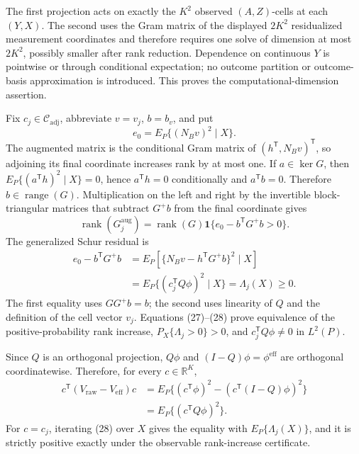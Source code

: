 The first projection acts on exactly the \(K^2\) observed \((A,Z)\)-cells at each \((Y,X)\).  The second uses the Gram matrix of the displayed \(2K^2\) residualized measurement coordinates and therefore requires one solve of dimension at most \(2K^2\), possibly smaller after rank reduction.  Dependence on continuous \(Y\) is pointwise or through conditional expectation; no outcome partition or outcome-basis approximation is introduced.  This proves the computational-dimension assertion.

Fix \(c_j\in\mathcal C_{\mathrm{adj}}\), abbreviate \(v=v_j\), \(b=b_v\), and put
\[
 e_0=E_P\{(N_Bv)^2\mid X\}. \tag{26}
\]
The augmented matrix is the conditional Gram matrix of \((h^{\mathsf T},N_Bv)^{\mathsf T}\), so adjoining its final coordinate increases rank by at most one.  If \(a\in\ker G\), then
\(E_P\{(a^{\mathsf T}h)^2\mid X\}=0\), hence \(a^{\mathsf T}h=0\) conditionally and \(a^{\mathsf T}b=0\).  Therefore \(b\in\operatorname{range}(G)\).  Multiplication on the left and right by the invertible block-triangular matrices that subtract \(G^+b\) from the final coordinate gives
\[
 \operatorname{rank}(G_j^{\mathrm{aug}})
 =\operatorname{rank}(G)
 \mathbf 1\{e_0-b^{\mathsf T}G^+b>0\}. \tag{27}
\]
The generalized Schur residual is
\[
\begin{aligned}
 e_0-b^{\mathsf T}G^+b
 &=E_P\!\left[\{N_Bv-h^{\mathsf T}G^+b\}^2\mid X\right]\\
 &=E_P\{(c_j^{\mathsf T}Q\phi)^2\mid X\}
 =\Lambda_j(X)\geq0. \tag{28}
\end{aligned}
\]
The first equality uses \(GG^+b=b\); the second uses linearity of \(Q\) and the definition of the cell vector \(v_j\).  Equations (27)--(28) prove equivalence of the positive-probability rank increase, \(P_X\{\Lambda_j>0\}>0\), and \(c_j^{\mathsf T}Q\phi\ne0\) in \(L^2(P)\).

Since \(Q\) is an orthogonal projection, \(Q\phi\) and \((I-Q)\phi=\phi^{\mathrm{eff}}\) are orthogonal coordinatewise.  Therefore, for every \(c\in\mathbb R^K\),
\[
\begin{aligned}
 c^{\mathsf T}(V_{\mathrm{raw}}-V_{\mathrm{eff}})c
 &=E_P\{(c^{\mathsf T}\phi)^2-(c^{\mathsf T}(I-Q)\phi)^2\}\\
 &=E_P\{(c^{\mathsf T}Q\phi)^2\}. \tag{29}
\end{aligned}
\]
For \(c=c_j\), iterating (28) over \(X\) gives the equality with \(E_P\{\Lambda_j(X)\}\), and it is strictly positive exactly under the observable rank-increase certificate.

